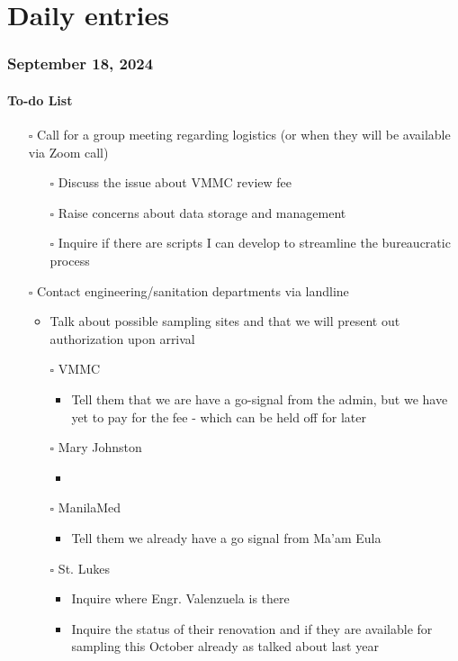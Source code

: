 \documentclass[11pt]{report}
\newcommand{\pending}{$\square$}
\begin{document}
\part{Daily entries}

\section*{September 18, 2024}

\subsection*{To-do List}
\begin{itemize}
	\item [\pending] Call for a group meeting regarding logistics (or when they will be available via Zoom call)
	
	\begin{itemize}
		\item [\pending] Discuss the issue about VMMC review fee
		\item [\pending] Raise concerns about data storage and management
		\item [\pending] Inquire if there are scripts I can develop to streamline the bureaucratic process
	
	\end{itemize}
	\item [\pending] Contact engineering/sanitation departments via landline
	\begin{itemize}
		\item Talk about possible sampling sites and that we will present out authorization upon arrival
	\end{itemize}
	\begin{itemize}
		\item [\pending] VMMC 
			\begin{itemize}
				\item Tell them that we are have a go-signal from the admin, but we have yet to pay for the fee - which can be held off for later
			\end{itemize}
		\item [\pending] Mary Johnston
			\begin{itemize}
				\item 
			\end{itemize}
		\item [\pending] ManilaMed 
				\begin{itemize}
				\item Tell them we already have a go signal from Ma'am Eula
			\end{itemize}
		\item [\pending] St. Lukes
			\begin{itemize}
				\item Inquire where Engr. Valenzuela is there
				\item Inquire the status of their renovation and if they are available for sampling this October already as talked about last year
			\end{itemize}
	\end{itemize}
		
\end{itemize}
\end{document}
